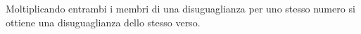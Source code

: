 Moltiplicando entrambi i membri di una disuguaglianza per uno stesso numero 
si ottiene una disuguaglianza dello stesso verso. 